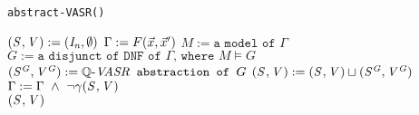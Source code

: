 
	\begin{algorithm}
		\caption{\texttt{abstract-VASR(\tranFormula)}}\label{euclid}
		\begin{algorithmic}[1]
			\State $\mathit{(S^{}, V^{})} := (\mathit{I_n}, \emptyset)$
			\State $\Gamma := F(\vec{x}, \vec{x}')$
			\State $M := \texttt{a model of } \Gamma$
			\State $G := \texttt{a disjunct of DNF of } \Gamma \texttt{, where } M \models G$
			\State $\mathit{(S^{G}, V^{G})} := \mathit{\mathbb{Q} \text{-}VASR} \texttt{ abstraction of }G$
			\State $\mathit{(S^{}, V^{})} := \mathit{(S^{}, V^{})} \sqcup \mathit{(S^{G}, V^{G})}$
			\State $\Gamma := \Gamma\ \land\ \neg\gamma\abst{}$
			\EndWhile \\
			\Return $\mathit{(S^{}, V^{})}$
		\end{algorithmic}
	\end{algorithm}
